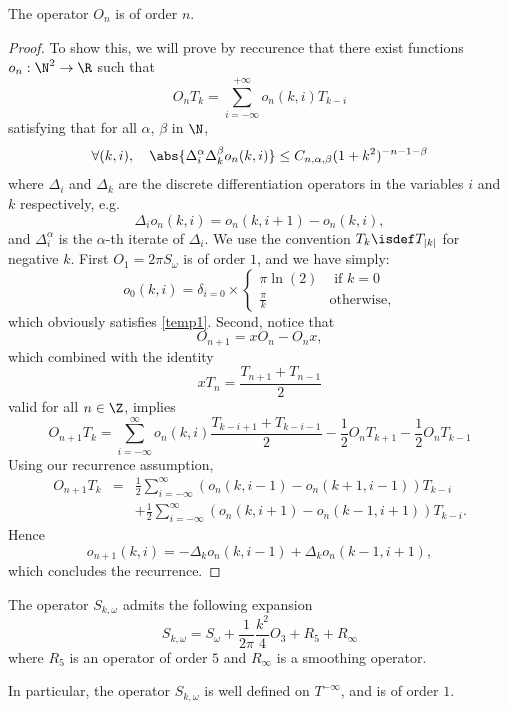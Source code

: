 \documentclass[a4paper]{article}
\begin{document}
\begin{Lem}
	\label{orderOfOn}
	The operator $O_n$ is of order $n$. 
	\begin{proof}
		To show this, we will prove by reccurence that there exist functions $o_n : \mathbb{\N}^2 \to \R $ such that
		\[O_n T_k = \sum_{i = -\infty}^{+ \infty} o_n(k,i)T_{k-i} \]
		satisfying that for all $\alpha$, $\beta$ in $\N$, \begin{equation}
		\forall (k,i), \quad \abs{\Delta^\alpha_i \Delta^\beta_k o_n(k,i)} \leq C_{n,\alpha,\beta}(1 + k^2)^{-n-1- \beta}
		\label{temp1}
		\end{equation} 
		where $\Delta_i$ and $\Delta_k$ are the discrete differentiation operators in the variables $i$ and $k$ respectively, e.g.
		\[\Delta_i o_n(k,i) =  o_n(k,i+1) -  o_n(k,i),\]
		and $\Delta_i^\alpha$ is the $\alpha$-th iterate of $\Delta_i$. We use the convention $T_k \isdef T_{|k|}$ for negative $k$. 
		First $O_1 = 2\pi S_\omega$ is of order $1$, and we have simply:
		\[o_0(k,i) = \delta_{i = 0} \times\begin{cases}
		\pi \ln(2) & \text{ if } k = 0\\
		\frac{\pi}{k} & \text{otherwise,}
		\end{cases}\] 
		which obviously satisfies \eqref{temp1}. Second, notice that 
		\[O_{n+1} = xO_n -  O_n x,\]
		which combined with the identity 
		\[x T_n = \frac{T_{n+1} + T_{n-1}}{2}\]
		valid for all $n \in \Z$, implies
		\[O_{n+1}T_k = \sum_{i=-\infty}^{\infty} o_n(k,i) \frac{T_{k-i + 1} + T_{k - i - 1}}{2} - \frac{1}{2}O_n T_{k+1} - \frac{1}{2} O_n T_{k-1}\]
		Using our recurrence assumption, 
		\begin{eqnarray*}
			O_{n+1}T_k &=& \frac{1}{2}\sum_{i = -\infty}^{\infty}(o_n(k,i-1) - o_n(k+1,i-1)) T_{k - i}\\
			&&+ \frac{1}{2} \sum_{i = -\infty }^{\infty}(o_n(k,i+1)-o_n(k-1,i+1)) T_{k - i}.
		\end{eqnarray*}
		Hence
		\[o_{n+1}(k,i) = -\Delta_k o_n(k,i-1) + \Delta_k o_n(k-1,i+1),\]
		which concludes the recurrence. 
	\end{proof}
\end{Lem}
\begin{Lem}
	The operator $S_{k,\omega}$ admits the following expansion 
	\[ S_{k, \omega} = S_\omega + \frac{1}{2\pi} \frac{k^2}{4} O_3 +  R_5 + R_{\infty}\]
	\label{developpementHankel}
	where $R_5$ is an operator of order $5$ and $R_\infty$ is a smoothing operator.
\end{Lem}
In particular, the operator $S_{k,\omega}$ is well defined on $T^{-\infty}$, and is of order $1$.
\end{document}
